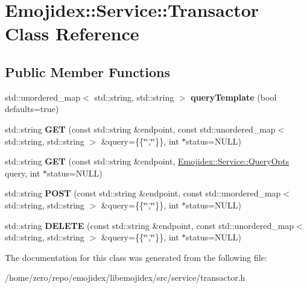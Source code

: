 \hypertarget{classEmojidex_1_1Service_1_1Transactor}{}\section{Emojidex\+:\+:Service\+:\+:Transactor Class Reference}
\label{classEmojidex_1_1Service_1_1Transactor}
\subsection*{Public Member Functions}
\begin{DoxyCompactItemize}
\item 
std\+::unordered\+\_\+map$<$ std\+::string, std\+::string $>$ {\bfseries query\+Template} (bool defaults=true)\hypertarget{classEmojidex_1_1Service_1_1Transactor_acdd10d6f4321b7a221c4bfb0d8590ff2}{}\label{classEmojidex_1_1Service_1_1Transactor_acdd10d6f4321b7a221c4bfb0d8590ff2}

\item 
std\+::string {\bfseries G\+ET} (const std\+::string \&endpoint, const std\+::unordered\+\_\+map$<$ std\+::string, std\+::string $>$ \&query=\{\{\char`\"{}\char`\"{},\char`\"{}\char`\"{}\}\}, int $\ast$status=N\+U\+LL)\hypertarget{classEmojidex_1_1Service_1_1Transactor_ad7db57d801c905c92ea81d0ae8e565b7}{}\label{classEmojidex_1_1Service_1_1Transactor_ad7db57d801c905c92ea81d0ae8e565b7}

\item 
std\+::string {\bfseries G\+ET} (const std\+::string \&endpoint, \hyperlink{classEmojidex_1_1Service_1_1QueryOpts}{Emojidex\+::\+Service\+::\+Query\+Opts} query, int $\ast$status=N\+U\+LL)\hypertarget{classEmojidex_1_1Service_1_1Transactor_aa21e59443304d5e9612981f4d7df4e8c}{}\label{classEmojidex_1_1Service_1_1Transactor_aa21e59443304d5e9612981f4d7df4e8c}

\item 
std\+::string {\bfseries P\+O\+ST} (const std\+::string \&endpoint, const std\+::unordered\+\_\+map$<$ std\+::string, std\+::string $>$ \&query=\{\{\char`\"{}\char`\"{},\char`\"{}\char`\"{}\}\}, int $\ast$status=N\+U\+LL)\hypertarget{classEmojidex_1_1Service_1_1Transactor_a5335a34c16a0d16bb0196fda4754b611}{}\label{classEmojidex_1_1Service_1_1Transactor_a5335a34c16a0d16bb0196fda4754b611}

\item 
std\+::string {\bfseries D\+E\+L\+E\+TE} (const std\+::string \&endpoint, const std\+::unordered\+\_\+map$<$ std\+::string, std\+::string $>$ \&query=\{\{\char`\"{}\char`\"{},\char`\"{}\char`\"{}\}\}, int $\ast$status=N\+U\+LL)\hypertarget{classEmojidex_1_1Service_1_1Transactor_a9e9d1edc59867650851b99129b6dcc1d}{}\label{classEmojidex_1_1Service_1_1Transactor_a9e9d1edc59867650851b99129b6dcc1d}

\end{DoxyCompactItemize}


The documentation for this class was generated from the following file\+:\begin{DoxyCompactItemize}
\item 
/home/zero/repo/emojidex/libemojidex/src/service/transactor.\+h\end{DoxyCompactItemize}
